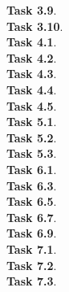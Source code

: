 \documentclass[11pt]{article}
\newcommand{\task}[1]{\clearpage\textbf{Task #1}. \\[0.5em]}
\begin{document}
\task{3.9}

\task{3.10}

\task{4.1}

\task{4.2}

\task{4.3}

\task{4.4}

\task{4.5}

\task{5.1}

\task{5.2}

\task{5.3}

\task{6.1}

\task{6.3}

\task{6.5}

\task{6.7}

\task{6.9}

\task{7.1}

\task{7.2}

\task{7.3}
\end{document}
